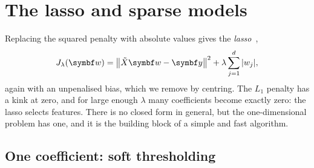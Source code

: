 \documentclass[11pt]{article}
\newcommand{\Xt}{\tilde X}
\newcommand{\w}{\vect{w}}
\newcommand{\y}{\vect{y}}
\begin{document}
\section{The lasso and sparse models}\label{sec:lasso}

Replacing the squared penalty with absolute values gives the \emph{lasso}~\cite{tibshirani1996},
\[
  J_\lambda(\w) = \norm{\Xt\w - \y}^2 + \lambda \sum_{j=1}^d |w_j| ,
\]
again with an unpenalised bias, which we remove by centring. The $L_1$ penalty has a kink at zero, and for large
enough $\lambda$ many coefficients become exactly zero: the lasso selects features. There is no closed form in general,
but the one-dimensional problem has one, and it is the building block of a simple and fast algorithm.

\subsection{One coefficient: soft thresholding}\label{sec:soft}
\end{document}
